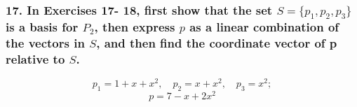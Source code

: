 \documentclass{article}
\begin{document}
\pagebreak
\subsubsection*{ 17. In Exercises 17- 18, first show that the set $S = \{p_1, p_2, p_3\}$ is a basis for $P_2$, then express $p$ as a linear combination of the vectors in $S$, and then find the coordinate vector of p relative to $S$. }

\[p_1 = 1 + x + x^2, \quad p_2 = x + x^2, \quad p_3 = x^2; \]
\[p = 7 - x + 2x^2\]
\vfill
\end{document}
